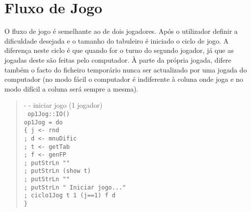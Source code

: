 \documentclass[a4paper,titlepage]{scrreprt}
\begin{document}
	\section{Fluxo de Jogo}
	O fluxo de jogo é semelhante ao de dois jogadores. Após o utilizador definir a dificuldade desejada e o tamanho do tabuleiro
	é iniciado o ciclo de jogo. A diferença neste ciclo é que quando for o turno do segundo jogador, já que as jogadas deste são
	feitas pelo computador. À parte da própria jogada, difere também o facto do ficheiro temporário nunca ser actualizado por uma
	jogada do computador (no modo fácil o computador é indiferente à coluna onde joga e no modo difícil a coluna será sempre a mesma).
		\begin{quote}
			{\small - - iniciar jogo (1 jogador)\\}
			{\tt
			op1Jog::IO()\\
			op1Jog = do\\
			\{ j <- rnd\\
			; d <- mnuDific\\
			; t <- getTab\\
			; f <- genFP\\
			; putStrLn ""\\
			; putStrLn (show t)\\
			; putStrLn ""\\
			; putStrLn " Iniciar jogo..."\\
			; ciclo1Jog t 1 (j==1) f d\\
			\}
			}
		\end{quote}
\end{document}
